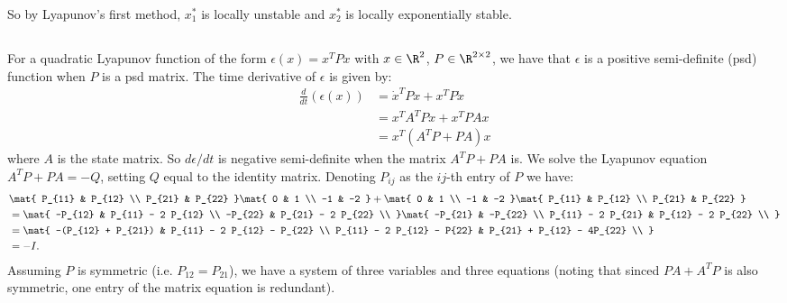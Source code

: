 \documentclass{homework}
\begin{document}
So by Lyapunov's first method, $x_1^*$ is locally unstable and $x_2^*$ is
locally exponentially stable.

\subsection{}

For a quadratic Lyapunov function of the form $\epsilon(x) = x^T P x$ with
$x\in\R^2$, $P\in\R^{2\times 2}$, we have that $\epsilon$ is a positive
semi-definite (psd) function when $P$ is a psd matrix. The time derivative
of $\epsilon$ is given by:
\begin{align*}
    \frac{d}{dt}(\epsilon(x)) &= \dot{x}^T P x + x^T P \dot{x} \\
        &= x^T A^T P x + x^T P A x \\
        &= x^T (A^T P + P A) x
\end{align*}
where $A$ is the state matrix.
So $d\epsilon/dt$ is negative semi-definite when the matrix $A^TP + PA$ is.
We solve the Lyapunov equation $A^TP + PA = -Q$, setting $Q$ equal to
the identity matrix. Denoting $P_{ij}$ as the $ij$-th entry of $P$
we have:
\begin{align*}
    &\mat{
        P_{11} & P_{12} \\
        P_{21} & P_{22}
    } \mat{
        0 & 1 \\
        -1 & -2
    } + 
    \mat{
        0 & 1 \\
        -1 & -2
    } \mat{
        P_{11} & P_{12} \\
        P_{21} & P_{22}
    } \\
    &= \mat{
        -P_{12} & P_{11} - 2 P_{12} \\
        -P_{22} & P_{21} - 2 P_{22} \\
    } \mat{
        -P_{21} &  -P_{22} \\
        P_{11} - 2 P_{21} & P_{12} - 2 P_{22} \\
    } \\
    &= \mat{
        -(P_{12} + P_{21}) & P_{11} - 2 P_{12} - P_{22} \\
        P_{11} - 2 P_{12} - P{22} & P_{21} + P_{12} - 4P_{22} \\
    }  \\
    &= -I.
\end{align*}
Assuming $P$ is symmetric (i.e. $P_{12} = P_{21}$), we have a system
of three variables and three equations (noting that sinced $PA + A^TP$ is also
symmetric, one entry of the matrix equation is redundant).
\end{document}

